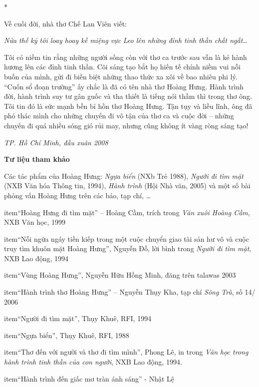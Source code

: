 \documentclass[../main.tex]{subfiles}
\begin{document}
\begin{multicols}{2}
        
*  
 
Về cuối đời, nhà thơ Chế Lan Viên viết:         
\begin{blockquote}
        
\textit{Nửa thế kỷ tôi loay hoay kề miệng vực} 
\textit{Leo lên những đỉnh tinh thần chất ngất…} 

\end{blockquote}
 
Tôi có niềm tin rằng những người sống còn với thơ ca trước sau vẫn là kẻ hành hương lên các đỉnh tinh thần. Cõi sáng tạo bắt họ hiến tế chính niềm vui nỗi buồn của mình, gửi đi biền biệt những thao thức xa xôi về bao nhiêu phi lý. “Cuốn sổ đoạn trường” ấy chắc là đã có tên nhà thơ Hoàng Hưng. Hành trình đời, hành trình suy tư gân guốc và tha thiết là tiếng nói thầm thì trong thơ ông. Tôi tin đó là sức mạnh bền bỉ hồn thơ Hoàng Hưng. Tận tụy và liều lĩnh, ông đã phó thác mình cho những chuyến đi vô tận của thơ ca và cuộc đời – những chuyến đi quá nhiều sóng gió rủi may, nhưng cũng không ít vàng ròng sáng tạo! 
 
\textit{TP. Hồ Chí Minh, đầu xuân 2008} 
 
 
\textbf{Tư liệu tham khảo } 
 
Các tác phẩm của Hoàng Hưng: \textit{Ngựa biển} (NXb Trẻ 1988), \textit{Người đi tìm mặt} (NXB Văn hóa Thông tin, 1994), \textit{Hành trình} (Hội Nhà văn, 2005) và một số bài phỏng vấn Hoàng Hưng trên các báo, tạp chí, … 
 \begin{enumerate}

item{“Hoàng Hưng đi tìm mặt” – Hoàng Cầm, trích trong \textit{Văn xuôi Hoàng Cầm}, NXB Văn học, 1999}

item{“Nỗi ngứa ngáy tiền kiếp trong một cuộc chuyển giao tài sản hư vô và cuộc truy tìm khuôn mặt Hoàng Hưng”, Nguyễn Đỗ, lời bình trong \textit{Người đi tìm mặt}, NXB Lao động, 1994}

item{“Vùng Hoàng Hưng”, Nguyễn Hữu Hồng Minh, đăng trên talawas 2003}

item{“Hành trình thơ Hoàng Hưng” – Nguyễn Thụy Kha, tạp chí \textit{Sông Trà}, số 14/ 2006}

item{“Người đi tìm mặt”, Thụy Khuê, RFI, 1994}

item{“Ngựa biển”, Thụy Khuê, RFI, 1988}

item{“Thơ đến với người và thơ đi tìm mình”, Phong Lê, in trong \textit{Văn học trong hành trình tinh thần của con người}, NXB Lao động, 1994.}

item{“Hành trình đến giấc mơ tràn ánh sáng” - Nhật Lệ}


\end{enumerate}
\end{multicols}
\end{document}
